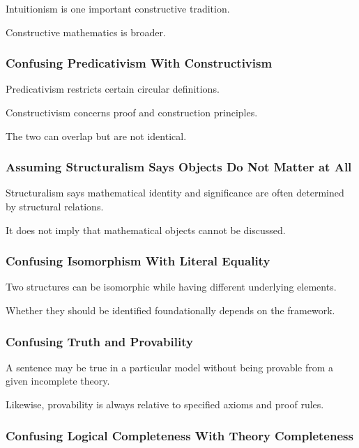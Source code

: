 Intuitionism is one important constructive tradition.

Constructive mathematics is broader.

\subsubsection{Confusing Predicativism With Constructivism}

Predicativism restricts certain circular definitions.

Constructivism concerns proof and construction principles.

The two can overlap but are not identical.

\subsubsection{Assuming Structuralism Says Objects Do Not Matter at All}

Structuralism says mathematical identity and significance are often
determined by structural relations.

It does not imply that mathematical objects cannot be discussed.

\subsubsection{Confusing Isomorphism With Literal Equality}

Two structures can be isomorphic while having different underlying
elements.

Whether they should be identified foundationally depends on the framework.

\subsubsection{Confusing Truth and Provability}

A sentence may be true in a particular model without being provable from a
given incomplete theory.

Likewise, provability is always relative to specified axioms and proof
rules.

\subsubsection{Confusing Logical Completeness With Theory Completeness}

